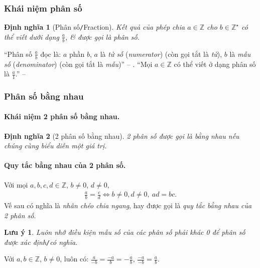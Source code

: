 \documentclass{article}
\numberwithin{equation}{section}
\newtheorem{dinhnghia}{Định nghĩa}[section]
\newtheorem{luuy}{Lưu ý}[section]
\begin{document}
\subsubsection{Khái niệm phân số}

\begin{dinhnghia}[Phân số\texttt{/}Fraction]
	Kết quả của phép chia $a\in\mathbb{Z}$ cho $b\in\mathbb{Z}^\star$ có thể viết dưới dạng $\frac{a}{b}$, \textit{\&} được gọi là \emph{phân số}.
\end{dinhnghia}
``Phân số $\frac{a}{b}$ đọc là: $a$ phần $b$, $a$ là \textit{tử số} (\textit{numerator}) (còn gọi tắt là \textit{tử}), $b$ là \textit{mẫu số} (\textit{denominator}) (còn gọi tắt là \textit{mẫu})'' -- \cite[p.  25]{SGK_Toan_6_Canh_Dieu_tap_2}. ``Mọi $a\in\mathbb{Z}$ có thể viết ở dạng phân số là $\frac{a}{1}$.'' -- \cite[p.  26]{SGK_Toan_6_Canh_Dieu_tap_2}

\subsubsection{Phân số bằng nhau}

\paragraph{Khái niệm 2 phân số bằng nhau.}
\begin{dinhnghia}[2 phân số bằng nhau]
	2 phân số được gọi là \emph{bằng nhau} nếu chúng cùng biểu diễn một giá trị.
\end{dinhnghia}

\paragraph{Quy tắc bằng nhau của 2 phân số.} Với mọi $a,b,c,d\in\mathbb{Z}$, $b\ne 0$, $d\ne 0$,
\begin{align*}
	\boxed{\frac{a}{b} = \frac{c}{d}\Leftrightarrow b\ne 0, d\ne 0,\ ad = bc.}
\end{align*}
Vế sau có nghĩa là \textit{nhân chéo chia ngang}, hay được gọi là \textit{quy tắc bằng nhau của 2 phân số}.

\begin{luuy}
	Luôn nhớ điều kiện mẫu số của các phân số phải khác 0 để phân số được xác định\emph{\texttt{/}}có nghĩa.
\end{luuy}
Với $a,b\in\mathbb{Z}$, $b\ne 0$, luôn có: $\frac{a}{-b} = \frac{-a}{b} = -\frac{a}{b}$, $\frac{-a}{-b} = \frac{a}{b}$.
\end{document}
